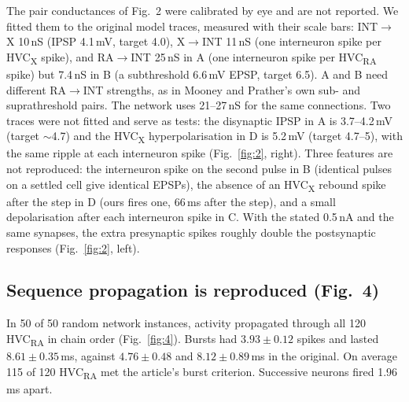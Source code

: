 The pair conductances of Fig.~2 were calibrated by eye and are not reported. We fitted them to
the original model traces, measured with their scale bars: INT$\to$X 10\,nS (IPSP 4.1\,mV, target
4.0), X$\to$INT 11\,nS (one interneuron spike per HVC\textsubscript{X} spike), and RA$\to$INT
25\,nS in A (one interneuron spike per HVC\textsubscript{RA} spike) but 7.4\,nS in B (a
subthreshold 6.6\,mV EPSP, target 6.5). A and B need different RA$\to$INT strengths, as in Mooney
and Prather's own sub- and suprathreshold pairs. The network uses 21--27\,nS for the same
connections. Two traces were not fitted and serve as tests: the disynaptic IPSP in A is
3.7--4.2\,mV (target $\sim$4.7) and the HVC\textsubscript{X} hyperpolarisation in D is 5.2\,mV
(target 4.7--5), with the same ripple at each interneuron spike (Fig.~\ref{fig:2}, right). Three
features are not reproduced: the interneuron spike on the second pulse in B (identical pulses on a
settled cell give identical EPSPs), the absence of an HVC\textsubscript{X} rebound spike after the
step in D (ours fires one, 66\,ms after the step), and a small depolarisation after each
interneuron spike in C. With the stated 0.5\,nA and the same synapses, the extra presynaptic spikes
roughly double the postsynaptic responses (Fig.~\ref{fig:2}, left).

\subsection*{Sequence propagation is reproduced (Fig.~4)}
In 50 of 50 random network instances, activity propagated through all 120
HVC\textsubscript{RA} in chain order (Fig.~\ref{fig:4}). Bursts had $3.93\pm0.12$ spikes and
lasted $8.61\pm0.35$\,ms, against $4.76\pm0.48$ and $8.12\pm0.89$\,ms in the original. On
average 115 of 120 HVC\textsubscript{RA} met the article's burst criterion. Successive neurons
fired 1.96\,ms apart.

